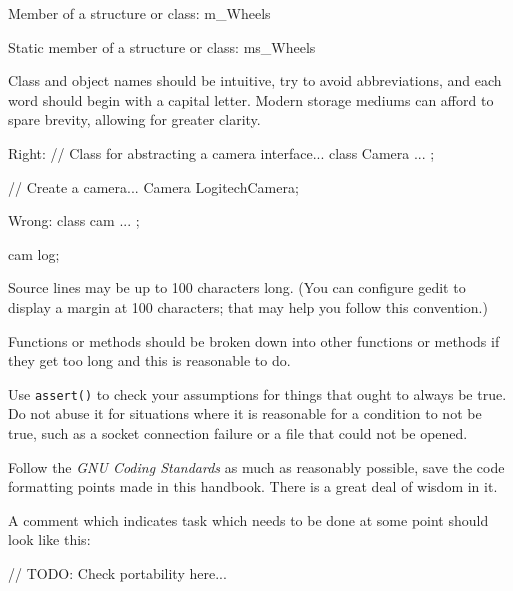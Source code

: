 Member of a structure or class:
\StartCodeExample
\starttyping
m_Wheels
\stoptyping
\StopCodeExample

Static member of a structure or class:
\StartCodeExample
\starttyping
ms_Wheels
\stoptyping
\StopCodeExample

\item
Class and object names should be intuitive, try to avoid abbreviations, and each word should begin with a capital letter. Modern storage mediums can afford to spare brevity, allowing for greater clarity.


Right:
\StartCodeExample
\starttyping
// Class for abstracting a camera interface...
class Camera
{
    ...
};

// Create a camera...
Camera LogitechCamera;
\stoptyping
\StopCodeExample

Wrong:
\StartCodeExample
\starttyping
class cam
{
    ...
};

cam log;
\stoptyping
\StopCodeExample

\stopitemize


\startitemize[3]
\setupwhitespace[big]
\item
Source lines may be up to 100 characters long. (You can configure gedit to display a margin at 100 characters; that may help you follow this convention.)

\item
Functions or methods should be broken down into other functions or methods if they get too long and this is reasonable to do.

\item
Use {\tt assert()} to check your assumptions for things that ought to always be true. Do not abuse it for situations where it is reasonable for a condition to not be true, such as a socket connection failure or a file that could not be opened.

\item
Follow the {\it GNU Coding Standards} as much as reasonably possible, save the code formatting points made in this handbook. There is a great deal of wisdom in it.

\item
A comment which indicates task which needs to be done at some point should look like this: 

\StartCodeExample
\starttyping
// TODO: Check portability here...
\stoptyping
\StopCodeExample

\stopitemize


